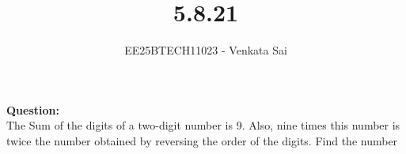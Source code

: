 \documentclass[journal]{IEEEtran}
\begin{document}


\title{5.8.21}
\author{EE25BTECH11023 - Venkata Sai}
\maketitle \vspace{-1cm}
\renewcommand{\thefigure}{\theenumi}
\renewcommand{\thetable}{\theenumi}
\setlength{\intextsep}{10pt} %

\renewcommand{\thetable}{\theenumi}

\textbf{Question:}  \\
The Sum of the digits of a two-digit number is 9. Also, nine times this number is twice the number obtained by reversing the order of the digits. Find the number \\
\end{document}
